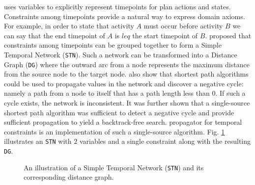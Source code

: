 \eu uses variables to explicitly represent timepoints for plan actions
and states. Constraints among timepoints provide a natural way to
express domain axioms. For example, in order to state that activity
$A$ must occur before activity $B$ we can say that the end timepoint
of $A$ is $leq$ the start timepoint of $B$.  \cite{dechter91} proposed
that constraints among timepoints can be grouped together to form a
Simple Temporal Network (\texttt{STN}). Such a network can be
transformed into a Distance Graph (\texttt{DG}) where the outward arc
from a node represents the maximum distance from the source node to
the target node.   also show that shortest path
algorithms  could be used
to propagate values in the network and discover a negative cycle:
namely a path from a node to itself that has a path length less than
$0$. If such a cycle exists, the network is 
inconsistent. It was further shown that a single-source shortest path
algorithm was sufficient to detect a negative cycle and provide
sufficient propagation to yield a backtrack-free search. \eus
propagator for temporal constraints is an implementation of such a
single-source algorithm. Fig. \ref{fig:stn} illustrates an
\texttt{STN} with $2$ variables and a single constraint along with the
resulting \texttt{DG}.

\begin{figure}[!htb]
  \centering
  \caption{\small An illustration of a Simple Temporal Network
    (\texttt{STN}) and its corresponding distance graph.}
  \label{fig:stn}
\end{figure}

